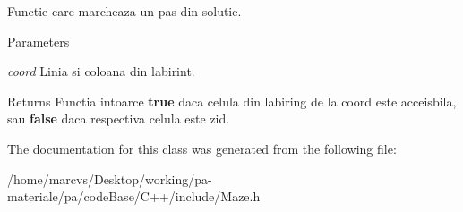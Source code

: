 Functie care marcheaza un pas din solutie. 


\begin{DoxyParams}{Parameters}
\item[{\em coord}]Linia si coloana din labirint. \end{DoxyParams}
\begin{DoxyReturn}{Returns}
Functia intoarce {\bfseries true} daca celula din labiring de la coord este acceisbila, sau {\bfseries false} daca respectiva celula este zid. 
\end{DoxyReturn}


The documentation for this class was generated from the following file:\begin{DoxyCompactItemize}
\item 
/home/marcvs/Desktop/working/pa-\/materiale/pa/codeBase/C++/include/Maze.h\end{DoxyCompactItemize}
